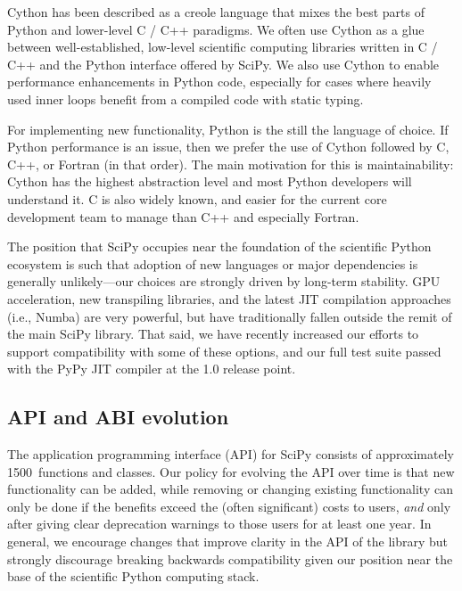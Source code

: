 \documentclass[fleqn,10pt]{wlscirep}
\begin{document}
Cython has been described as a creole language that mixes the best parts of Python and
lower-level C / C++ paradigms\cite{behnel2011cython}. We often use Cython
as a glue between well-established, low-level scientific computing libraries written
in C / C++ and the Python interface offered by SciPy. We also use Cython to enable performance
enhancements in Python code, especially for cases where heavily used inner
loops benefit from a compiled code with static typing.

For implementing new functionality, Python is the still the language of choice. If Python
performance is an issue, then we prefer the use of Cython followed by C, C++, or Fortran (in that
order). The main motivation for this is maintainability: Cython has the
highest abstraction level and most Python developers will understand it. C is
also widely known, and easier for the current core development team to manage
than C++ and especially Fortran.

The position that SciPy occupies near the
foundation of the scientific Python ecosystem is such that adoption of new
languages or major dependencies is generally unlikely---our choices are strongly
driven by long-term stability. GPU acceleration, new transpiling libraries, and
the latest JIT compilation approaches (i.e.,
Numba\cite{Lam:2015:NLP:2833157.2833162}) are very powerful, but have traditionally fallen
outside the remit of the main SciPy library. That said, we have recently
increased our efforts to support compatibility with some of these options, and
our full test suite passed with the PyPy JIT compiler\cite{Bolz:2009:TMP:1565824.1565827}
at the 1.0 release point.

\subsection*{API and ABI evolution}

The application programming interface (API) for SciPy consists of approximately
\num{1500}~functions and classes.  Our policy for evolving the API over time is that
new functionality can be added, while removing or changing existing
functionality can only be done if the benefits exceed the (often
significant) costs to users, \textit{and} only after giving clear deprecation
warnings to those users for at least one year. In general, we encourage
changes that improve clarity in the API of the library but strongly discourage
breaking backwards compatibility given our position near the base of the
scientific Python computing stack.
\end{document}
